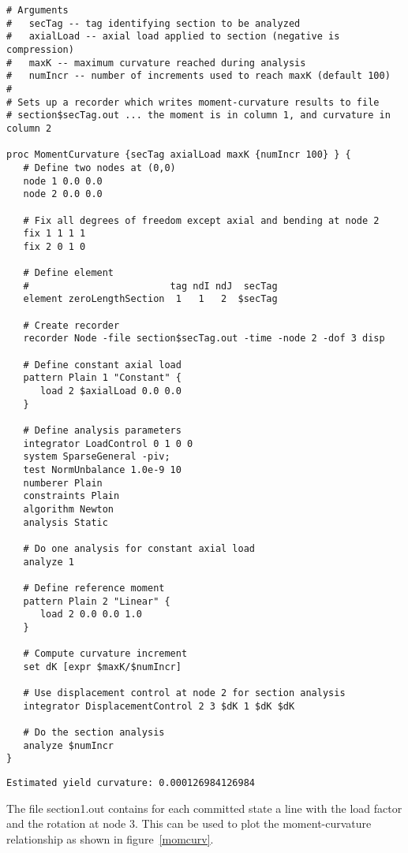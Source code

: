 \documentclass[12pt]{article}
\begin{document}
{\sf\small
\begin{verbatim}
# Arguments
#	secTag -- tag identifying section to be analyzed
#	axialLoad -- axial load applied to section (negative is compression)
#	maxK -- maximum curvature reached during analysis
#	numIncr -- number of increments used to reach maxK (default 100)
#
# Sets up a recorder which writes moment-curvature results to file
# section$secTag.out ... the moment is in column 1, and curvature in column 2

proc MomentCurvature {secTag axialLoad maxK {numIncr 100} } {
   # Define two nodes at (0,0)
   node 1 0.0 0.0
   node 2 0.0 0.0

   # Fix all degrees of freedom except axial and bending at node 2
   fix 1 1 1 1
   fix 2 0 1 0

   # Define element
   #                         tag ndI ndJ  secTag
   element zeroLengthSection  1   1   2  $secTag

   # Create recorder
   recorder Node -file section$secTag.out -time -node 2 -dof 3 disp

   # Define constant axial load
   pattern Plain 1 "Constant" {
      load 2 $axialLoad 0.0 0.0
   }

   # Define analysis parameters
   integrator LoadControl 0 1 0 0
   system SparseGeneral -piv;
   test NormUnbalance 1.0e-9 10
   numberer Plain
   constraints Plain
   algorithm Newton
   analysis Static

   # Do one analysis for constant axial load
   analyze 1

   # Define reference moment
   pattern Plain 2 "Linear" {
      load 2 0.0 0.0 1.0
   }

   # Compute curvature increment
   set dK [expr $maxK/$numIncr]

   # Use displacement control at node 2 for section analysis
   integrator DisplacementControl 2 3 $dK 1 $dK $dK

   # Do the section analysis
   analyze $numIncr
}

\end{verbatim}}


\pagebreak
\vspace{0.2in} 

{\sf\small
\begin{verbatim}
Estimated yield curvature: 0.000126984126984
\end{verbatim}
}

The file section1.out contains for each committed state
a line with the load factor and the rotation at node 3. This can be
used to plot the moment-curvature relationship as shown in
figure~\ref{momcurv}.   
\end{document}

